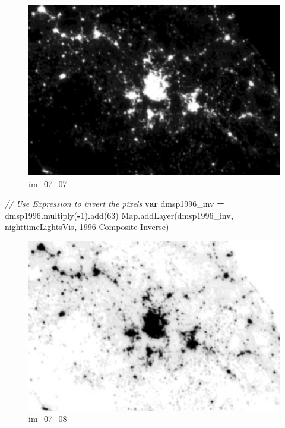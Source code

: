 \documentclass[
]{article}
\newenvironment{Shaded}{\begin{snugshade}}{\end{snugshade}}
\newcommand{\BuiltInTok}[1]{#1}
\newcommand{\CommentTok}[1]{\textcolor[rgb]{0.56,0.35,0.01}{\textit{#1}}}
\newcommand{\DecValTok}[1]{\textcolor[rgb]{0.00,0.00,0.81}{#1}}
\newcommand{\FunctionTok}[1]{\textcolor[rgb]{0.00,0.00,0.00}{#1}}
\newcommand{\KeywordTok}[1]{\textcolor[rgb]{0.13,0.29,0.53}{\textbf{#1}}}
\newcommand{\NormalTok}[1]{#1}
\newcommand{\OperatorTok}[1]{\textcolor[rgb]{0.81,0.36,0.00}{\textbf{#1}}}
\newcommand{\StringTok}[1]{\textcolor[rgb]{0.31,0.60,0.02}{#1}}
\begin{document}
\begin{figure}
\centering
\includegraphics{./im/im_07_07.png}
\caption{im\_07\_07}
\end{figure}

\begin{Shaded}
\begin{Highlighting}[]
\CommentTok{// Use Expression to invert the pixels}
\KeywordTok{var}\NormalTok{ dmsp1996\_inv }\OperatorTok{=}\NormalTok{ dmsp1996}\OperatorTok{.}\FunctionTok{multiply}\NormalTok{(}\OperatorTok{{-}}\DecValTok{1}\NormalTok{)}\OperatorTok{.}\FunctionTok{add}\NormalTok{(}\DecValTok{63}\NormalTok{)}
\BuiltInTok{Map}\OperatorTok{.}\FunctionTok{addLayer}\NormalTok{(dmsp1996\_inv}\OperatorTok{,}\NormalTok{ nighttimeLightsVis}\OperatorTok{,} \StringTok{\textquotesingle{}1996 Composite Inverse\textquotesingle{}}\NormalTok{)}
\end{Highlighting}
\end{Shaded}

\begin{figure}
\centering
\includegraphics{./im/im_07_08.png}
\caption{im\_07\_08}
\end{figure}
\end{document}
